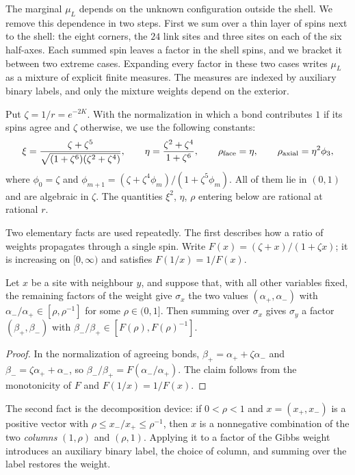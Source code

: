 The marginal $\mu_L$ depends on the unknown configuration outside the shell. We remove this dependence in two steps. First we sum over a thin layer of spins next to the shell: the eight corners, the $24$ link sites and three sites on each of the six half-axes. Each summed spin leaves a factor in the shell spins, and we bracket it between two extreme cases. Expanding every factor in these two cases writes $\mu_L$ as a mixture of explicit finite measures. The measures are indexed by auxiliary binary labels, and only the mixture weights depend on the exterior.

Put $\zeta=1/r=e^{-2K}$. With the normalization in which a bond contributes $1$ if its spins agree and $\zeta$ otherwise, we use the following constants:
\begin{equation}\label{eq:shellconstants}
 \xi=\frac{\zeta+\zeta^5}{\sqrt{(1+\zeta^6)(\zeta^2+\zeta^4)}},\qquad
 \eta=\frac{\zeta^2+\zeta^4}{1+\zeta^6},\qquad
 \rho_{\rm face}=\eta,\qquad \rho_{\rm axial}=\eta^2\phi_3,
\end{equation}
where $\phi_0=\zeta$ and $\phi_{m+1}=(\zeta+\zeta^4\phi_m)/(1+\zeta^5\phi_m)$. All of them lie in $(0,1)$ and are algebraic in $\zeta$. The quantities $\xi^2$, $\eta$, $\rho$ entering below are rational at rational $r$.

Two elementary facts are used repeatedly. The first describes how a ratio of weights propagates through a single spin. Write $F(x)=(\zeta+x)/(1+\zeta x)$; it is increasing on $[0,\infty)$ and satisfies $F(1/x)=1/F(x)$.

\begin{lemma}\label{lem:oddstransfer}
Let $x$ be a site with neighbour $y$, and suppose that, with all other variables fixed, the remaining factors of the weight give $\sigma_x$ the two values $(\alpha_+,\alpha_-)$ with $\alpha_-/\alpha_+\in[\rho,\rho^{-1}]$ for some $\rho\in(0,1]$. Then summing over $\sigma_x$ gives $\sigma_y$ a factor $(\beta_+,\beta_-)$ with $\beta_-/\beta_+\in[F(\rho),F(\rho)^{-1}]$.
\end{lemma}

\begin{proof}
In the normalization of agreeing bonds, $\beta_+=\alpha_++\zeta\alpha_-$ and $\beta_-=\zeta\alpha_++\alpha_-$, so $\beta_-/\beta_+=F(\alpha_-/\alpha_+)$. The claim follows from the monotonicity of $F$ and $F(1/x)=1/F(x)$.
\end{proof}

The second fact is the decomposition device: if $0<\rho<1$ and $x=(x_+,x_-)$ is a positive vector with $\rho\le x_-/x_+\le\rho^{-1}$, then $x$ is a nonnegative combination of the two \emph{columns} $(1,\rho)$ and $(\rho,1)$. Applying it to a factor of the Gibbs weight introduces an auxiliary binary label, the choice of column, and summing over the label restores the weight.


